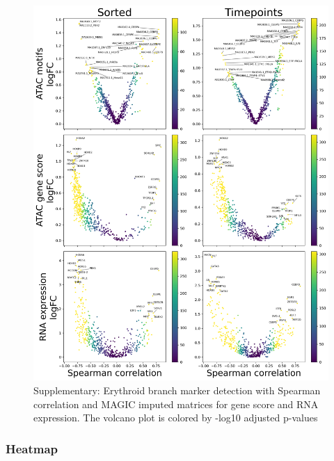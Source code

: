 \documentclass[a4paper]{article}
\begin{document}
\begin{figure}[!htb]
  \centering
  \includegraphics[width=\textwidth]{../figures/hematopoiesis/Monocyte_40_15_smooth_magic_single_branch_volcanos_motifs.png}
  \caption{Supplementary: Erythroid branch marker detection with Spearman correlation and MAGIC imputed matrices for gene score and RNA expression. The volcano plot is colored by -log10 adjusted p-values}
\end{figure}

\FloatBarrier
\subsubsection{Heatmap}
\end{document}
